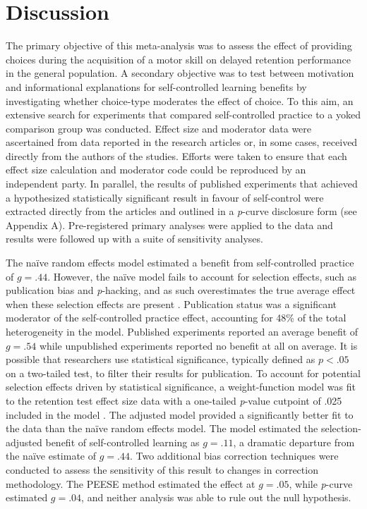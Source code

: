 \documentclass[man,floatsintext,hidelinks]{apa7}
\begin{document}
\section{Discussion}
The primary objective of this meta-analysis was to assess the effect of providing choices during the acquisition of a motor skill on delayed retention performance in the general population. A secondary objective was to test between motivation and informational explanations for self-controlled learning benefits by investigating whether choice-type moderates the effect of choice. To this aim, an extensive search for experiments that compared self-controlled practice to a yoked comparison group was conducted. Effect size and moderator data were ascertained from data reported in the research articles or, in some cases, received directly from the authors of the studies. Efforts were taken to ensure that each effect size calculation and moderator code could be reproduced by an independent party. In parallel, the results of published experiments that achieved a hypothesized statistically significant result in favour of self-control were extracted directly from the articles and outlined in a \emph{p}-curve disclosure form (see Appendix A). Pre-registered primary analyses were applied to the data and results were followed up with a suite of sensitivity analyses.

The naïve random effects model estimated a benefit from self-controlled practice of $g = .44$. However, the naïve model fails to account for selection effects, such as publication bias and \emph{p}-hacking, and as such overestimates the true average effect when these selection effects are present \parencite{Carter2019-vv,Hedges1996-yh,Stanley2014-xl}. Publication status was a significant moderator of the self-controlled practice effect, accounting for 48\% of the total heterogeneity in the model. Published experiments reported an average benefit of $g = .54$ while unpublished experiments reported no benefit at all on average. It is possible that researchers use statistical significance, typically defined as $p < .05$ on a two-tailed test, to filter their results for publication. To account for potential selection effects driven by statistical significance, a weight-function model was fit to the retention test effect size data with a one-tailed \emph{p}-value cutpoint of .025 included in the model \parencite{Vevea1995-uv}. The adjusted model provided a significantly better fit to the data than the naïve random effects model. The model estimated the selection-adjusted benefit of self-controlled learning as $g = .11$, a dramatic departure from the naïve estimate of $g = .44$. Two additional bias correction techniques were conducted to assess the sensitivity of this result to changes in correction methodology. The PEESE method estimated the effect at $g = .05$, while \emph{p}-curve estimated $g = .04$, and neither analysis was able to rule out the null hypothesis.
\end{document}
